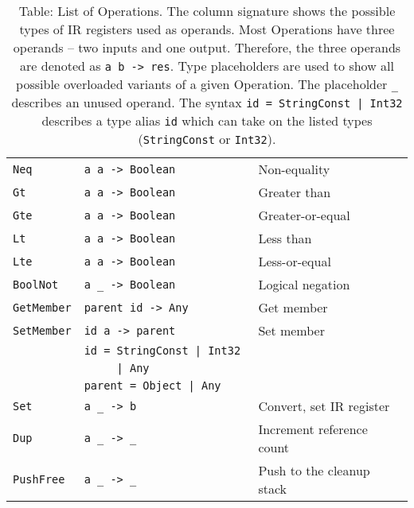 \begin{table}
\begin{tabular}{l | l | l}
        \texttt{Neq}         & \texttt{a      a     -> Boolean  } &  Non-equality               \\
        \texttt{Gt}          & \texttt{a      a     -> Boolean  } &  Greater than               \\
        \texttt{Gte}         & \texttt{a      a     -> Boolean  } &  Greater-or-equal           \\
        \texttt{Lt}          & \texttt{a      a     -> Boolean  } &  Less than                  \\
        \texttt{Lte}         & \texttt{a      a     -> Boolean  } &  Less-or-equal              \\
        \texttt{BoolNot}     & \texttt{a      \_    -> Boolean  } &  Logical negation           \\\hline
        \texttt{GetMember}   & \texttt{parent id    -> Any      } &  Get member                 \\
        \texttt{SetMember}   & \texttt{id     a     -> parent   } &  Set member                 \\
                             & \texttt{id = StringConst | Int32 } &                             \\
                             & \texttt{~~~~~| Any                 } &                             \\
                             & \texttt{parent = Object | Any    } &                             \\\hline
        \texttt{Set}         & \texttt{a      \_    -> b        } &  Convert, set IR register   \\
        \texttt{Dup}         & \texttt{a      \_    -> \_       } &  Increment reference count  \\
        \texttt{PushFree}    & \texttt{a      \_    -> \_       } &  Push to the cleanup stack  \\
    \end{tabular}
    \caption{Table: List of Operations. The column signature shows the possible types of IR registers used as operands. Most Operations have three operands -- two inputs and one output. Therefore, the three operands are denoted as \texttt{a b -> res}. Type placeholders are used to show all possible overloaded variants of a given Operation. The placeholder \texttt{\_} describes an unused operand. The syntax \texttt{id = StringConst | Int32} describes a type alias \texttt{id} which can take on the listed types (\texttt{StringConst} or \texttt{Int32}). }
    \label{tab:opcodes}
\end{table}


